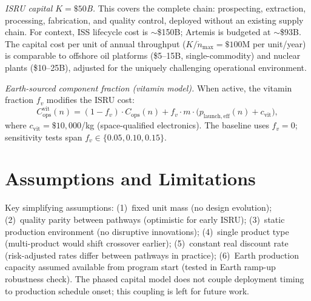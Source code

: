 \documentclass[preprint,12pt]{elsarticle}
\begin{document}
\emph{ISRU capital $K = \$50$B.} This covers the complete chain: prospecting, extraction, processing, fabrication, and quality control, deployed without an existing supply chain. For context, ISS lifecycle cost is $\sim$\$150B; Artemis is budgeted at $\sim$\$93B. The capital cost per unit of annual throughput ($K/\dot{n}_{\max} = \$100$M per unit/year) is comparable to offshore oil platforms (\$5--15B, single-commodity) and nuclear plants (\$10--25B), adjusted for the uniquely challenging operational environment.

\emph{Earth-sourced component fraction (vitamin model).} When active, the vitamin fraction $f_v$ modifies the ISRU cost:
\begin{equation}
  C_{\mathrm{ops}}^{\mathrm{vit}}(n) = (1 - f_v) \cdot C_{\mathrm{ops}}(n) + f_v \cdot m \cdot \bigl(p_{\mathrm{launch,eff}}(n) + c_{\mathrm{vit}}\bigr),
  \label{eq:vitamin}
\end{equation}
where $c_{\mathrm{vit}} = \$10{,}000$/kg (space-qualified electronics). The baseline uses $f_v = 0$; sensitivity tests span $f_v \in \{0.05, 0.10, 0.15\}$.

\section{Assumptions and Limitations}
\label{sec:appendix_assumptions}

Key simplifying assumptions: (1)~fixed unit mass (no design evolution); (2)~quality parity between pathways (optimistic for early ISRU); (3)~static production environment (no disruptive innovations); (4)~single product type (multi-product would shift crossover earlier); (5)~constant real discount rate (risk-adjusted rates differ between pathways in practice); (6)~Earth production capacity assumed available from program start (tested in Earth ramp-up robustness check). The phased capital model does not couple deployment timing to production schedule onset; this coupling is left for future work.
\end{document}
